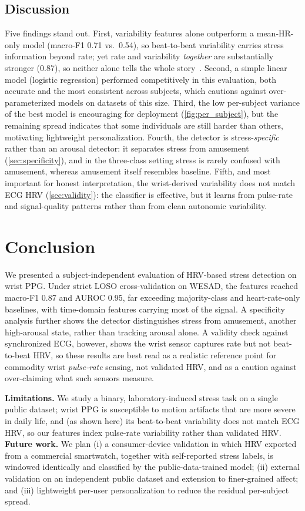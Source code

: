 \documentclass[conference]{IEEEtran}
\begin{document}
\subsection{Discussion}
Five findings stand out. First, variability features alone outperform a mean-HR-only
model (macro-F1 0.71 vs.\ 0.54), so beat-to-beat variability carries stress
information beyond rate; yet rate and variability \emph{together} are substantially
stronger (0.87), so neither alone tells the whole story~\cite{taskforce1996hrv,kim2018hrv}.
Second, a simple linear model (logistic regression) performed competitively in this
evaluation, both accurate and the most consistent across subjects, which cautions
against over-parameterized models on datasets of this size. Third, the low per-subject
variance of the best model is encouraging for deployment (\cref{fig:per_subject}), but
the remaining spread indicates that some individuals are still harder than others,
motivating lightweight personalization. Fourth, the detector is stress-\emph{specific}
rather than an arousal detector: it separates stress from amusement (\cref{sec:specificity}),
and in the three-class setting stress is rarely confused with amusement, whereas amusement
itself resembles baseline. Fifth, and most important for honest
interpretation, the wrist-derived variability does not match ECG HRV
(\cref{sec:validity}): the classifier is effective, but it learns from pulse-rate and
signal-quality patterns rather than from clean autonomic variability.

\section{Conclusion}
\label{sec:conclusion}
We presented a subject-independent evaluation of HRV-based stress detection on wrist
PPG. Under strict LOSO cross-validation on WESAD, the features reached macro-F1 0.87
and AUROC 0.95, far exceeding majority-class and heart-rate-only baselines, with
time-domain features carrying most of the signal. A specificity analysis further shows
the detector distinguishes stress from amusement, another high-arousal state, rather than
tracking arousal alone. A validity check against
synchronized ECG, however, shows the wrist sensor captures rate but not beat-to-beat
HRV, so these results are best read as a realistic reference point for commodity wrist
\emph{pulse-rate} sensing, not validated HRV, and as a caution against over-claiming
what such sensors measure.

\textbf{Limitations.} We study a binary, laboratory-induced stress task on a single
public dataset; wrist PPG is susceptible to motion artifacts that are more severe in
daily life, and (as shown here) its beat-to-beat variability does not match ECG HRV,
so our features index pulse-rate variability rather than validated HRV. \textbf{Future work.} We plan (i) a consumer-device
validation in which HRV exported from a commercial smartwatch, together with
self-reported stress labels, is windowed identically and classified by the
public-data-trained model; (ii) external validation on an independent public dataset and
extension to finer-grained affect; and (iii)
lightweight per-user personalization to reduce the residual per-subject spread.
\end{document}
